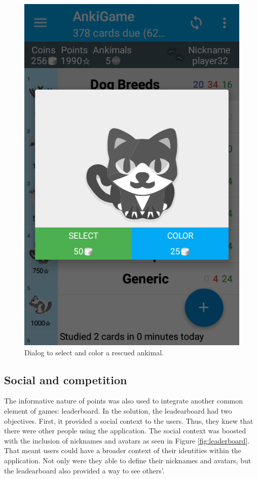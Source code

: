 \begin{figure}[htb]
    \vskip 5mm
        \begin{center}
            \includegraphics[scale=0.4]{./Figures/ankimal_selection.png}
            \caption{Dialog to select and color a rescued ankimal.}
            \label{fig:ankimals-select}
        \end{center}
    \vskip -5mm
\end{figure}

\subsection{Social and competition}
The informative nature of points was also used to integrate another common element of games: leaderboard. In the solution, the leadearboard had two objectives. First, it provided a social context to the users. Thus, they knew that there were other people using the application. The social context was boosted with the inclusion of nicknames and avatars as seen in Figure \ref{fig:leaderboard}. That meant users could have a broader context of their identities within the application. Not only were they able to define their nicknames and avatars, but the leadearboard also provided a way to see others'.

